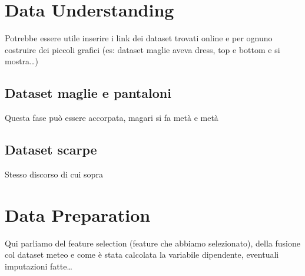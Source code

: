 \documentclass[a4paper, 11pt, oneside]{report}
\begin{document}
    \section{Data Understanding}
            Potrebbe essere utile inserire i link dei dataset trovati online e per ognuno costruire dei piccoli grafici
            (es: dataset maglie aveva dress, top e bottom e si mostra\ldots)
                \subsection{Dataset maglie e pantaloni}
                Questa fase può essere accorpata, magari si fa metà e metà
                \subsection{Dataset scarpe}
                Stesso discorso di cui sopra

            \section{Data Preparation}
            Qui parliamo del feature selection (feature che abbiamo selezionato), della fusione col dataset meteo e come
            è stata calcolata la variabile dipendente, eventuali imputazioni fatte\ldots
                \newpage
\end{document}
